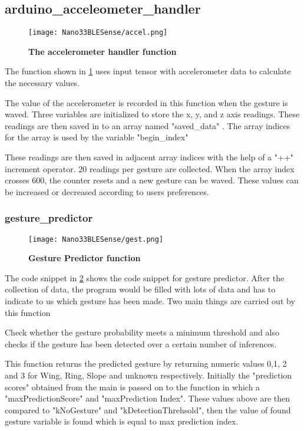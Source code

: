 \subsection{arduino\_acceleometer\_handler}

\begin{figure}[h!]
    \texttt{[image: Nano33BLESense/accel.png]}
    \caption{\textbf{The accelerometer handler function}}
    \label{accel}
\end{figure}

The function shown in \ref{accel}  uses input tensor with accelerometer data to calculate the necessary values. 


The value of the accelerometer is recorded in this function when the gesture is waved. Three variables are initialized to store the x, y, and z axis readings. 
These readings are then saved in to an array named "saved\_data" . The array indices for the array is used by the variable "begin\_index" 


These readings are then saved in adjacent array indices with the help of a "++" increment operator. 20 readings per gesture are collected. When the array index crosses 600, the counter resets and a new gesture can be waved. These values can be increased or decreased according to users preferences. 

\subsubsection{gesture\_predictor} 

\begin{figure}[h!]
    \texttt{[image: Nano33BLESense/gest.png]}
    \caption{\textbf{Gesture Predictor function}}
    \label{gest}
\end{figure}

The code snippet in \ref{gest} shows the code snippet for gesture predictor.
After the collection of data, the program would be filled with lots of data and has to indicate to us which gesture has been made. Two main things are carried out by this function 

Check whether the gesture probability meets a minimum threshold and also checks if the gesture has been detected over a certain number of inferences. 


This function returns the predicted gesture by returning numeric values 0,1, 2 and 3 for Wing, Ring, Slope and unknown respectively. 
Initially the "prediction scores" obtained from the main is passed on to the function in which a "maxPredictionScore" and "maxPrediction Index".
These values  above are then compared to "kNoGesture" and "kDetectionThrehsold", then the value of found gesture variable is found which is equal to max prediction index. 



